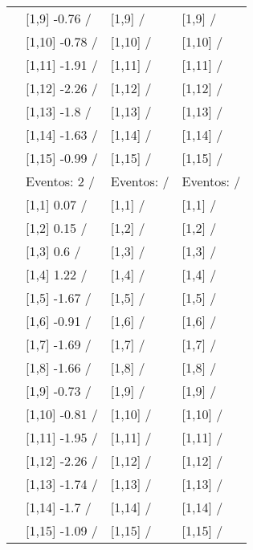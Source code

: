 \begin{table}
\begin{tabular}[t]{llll}
\addlinespace
 & {}[1,9] -0.76  / & {}[1,9]  / & {}[1,9]  /\\
 & {}[1,10] -0.78  / & {}[1,10]  / & {}[1,10]  /\\
 & {}[1,11] -1.91  / & {}[1,11]  / & {}[1,11]  /\\
 & {}[1,12] -2.26  / & {}[1,12]  / & {}[1,12]  /\\
 & {}[1,13] -1.8  / & {}[1,13]  / & {}[1,13]  /\\
\addlinespace
 & {}[1,14] -1.63  / & {}[1,14]  / & {}[1,14]  /\\
 & {}[1,15] -0.99  / & {}[1,15]  / & {}[1,15]  /\\
 & Eventos:  2 / & Eventos:   / & Eventos:   /\\
 & {}[1,1] 0.07  / & {}[1,1]  / & {}[1,1]  /\\
 & {}[1,2] 0.15  / & {}[1,2]  / & {}[1,2]  /\\
\addlinespace
 & {}[1,3] 0.6  / & {}[1,3]  / & {}[1,3]  /\\
 & {}[1,4] 1.22  / & {}[1,4]  / & {}[1,4]  /\\
 & {}[1,5] -1.67  / & {}[1,5]  / & {}[1,5]  /\\
 & {}[1,6] -0.91  / & {}[1,6]  / & {}[1,6]  /\\
 & {}[1,7] -1.69  / & {}[1,7]  / & {}[1,7]  /\\
\addlinespace
500 & {}[1,8] -1.66  / & {}[1,8]  / & {}[1,8]  /\\
 & {}[1,9] -0.73  / & {}[1,9]  / & {}[1,9]  /\\
 & {}[1,10] -0.81  / & {}[1,10]  / & {}[1,10]  /\\
 & {}[1,11] -1.95  / & {}[1,11]  / & {}[1,11]  /\\
 & {}[1,12] -2.26  / & {}[1,12]  / & {}[1,12]  /\\
\addlinespace
 & {}[1,13] -1.74  / & {}[1,13]  / & {}[1,13]  /\\
 & {}[1,14] -1.7  / & {}[1,14]  / & {}[1,14]  /\\
 & {}[1,15] -1.09  / & {}[1,15]  / & {}[1,15]  /\\
\bottomrule
\end{tabular}
\end{table}
